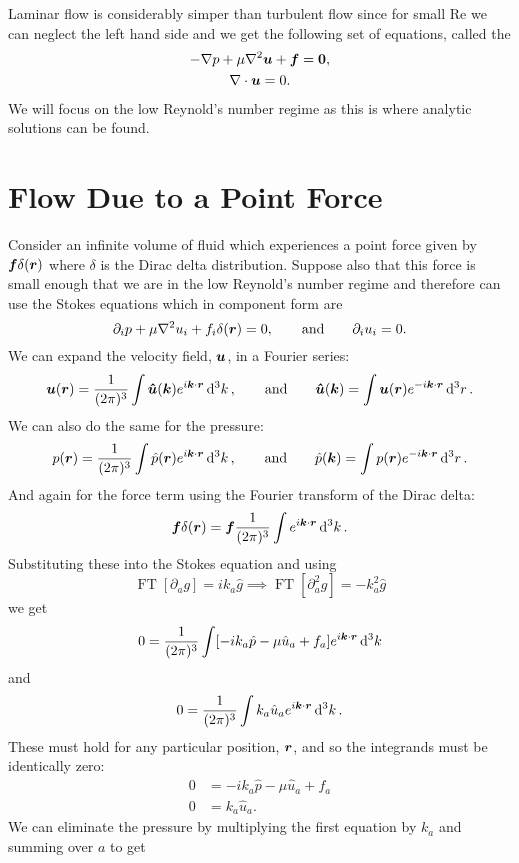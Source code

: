 \documentclass[a4paper]{article}
\DeclareMathOperator{\FT}{FT}
\newcommand{\reynoldsNumber}{\mathrm{Re}}
\begin{document}
    Laminar flow is considerably simper than turbulent flow since for small \(\reynoldsNumber\) we can neglect the left hand side and we get the following set of equations, called the 
    \begin{gather*}
        -\nabla p + \mu\nabla^2\bm{u} + \bm{f} = \bm{0},\\
        \nabla\cdot \bm{u} = 0.
    \end{gather*}
    We will focus on the low Reynold's number regime as this is where analytic solutions can be found.
    
    \section{Flow Due to a Point Force}
    Consider an infinite volume of fluid which experiences a point force given by \(\bm{f}\delta(\bm{r})\) where \(\delta\) is the Dirac delta distribution.
    Suppose also that this force is small enough that we are in the low Reynold's number regime and therefore can use the Stokes equations which in component form are
    \[\partial_i p + \mu\nabla^2 u_i + f_i\delta(\bm{r}) = 0, \qquad\text{and}\qquad \partial_iu_i = 0.\]
    We can expand the velocity field, \(\bm{u}\), in a Fourier series:
    \[\bm{u}(\bm{r}) = \frac{1}{(2\pi)^3} \int \bm{\hat{u}}(\bm{k}) e^{i\bm{k}\cdot\bm{r}}\dd[3]{k}, \qquad\text{and}\qquad \bm{\hat{u}}(\bm{k}) = \int \bm{u}(\bm{r})e^{-i\bm{k}\cdot\bm{r}} \dd[3]{r}.\]
    We can also do the same for the pressure:
    \[p(\bm{r}) = \frac{1}{(2\pi)^3} \int \hat{p}(\bm{r}) e^{i\bm{k}\cdot\bm{r}}\dd[3]{k}, \qquad\text{and}\qquad \hat{p}(\bm{k}) = \int p(\bm{r}) e^{-i\bm{k}\cdot\bm{r}} \dd[3]{r}.\]
    And again for the force term using the Fourier transform of the Dirac delta:
    \[\bm{f}\delta(\bm{r}) = \bm{f}\frac{1}{(2\pi)^3} \int e^{i\bm{k}\cdot\bm{r}} \dd[3]{k}.\]
    Substituting these into the Stokes equation and using
    \[\FT[\partial_a g] = ik_a\hat{g} \implies \FT[\partial_a^2g] = -k_a^2\hat{g}\]
    we get
    \[0 = \frac{1}{(2\pi)^3} \int [-ik_a\hat{p} - \mu\hat{u}_a + f_a]e^{i\bm{k}\cdot\bm{r}}\dd[3]{k}\]
    and
    \[0 = \frac{1}{(2\pi)^3} \int k_a\hat{u}_a e^{i\bm{k}\cdot\bm{r}}\dd[3]{k}.\]
    These must hold for any particular position, \(\bm{r}\), and so the integrands must be identically zero:
    \begin{align*}
        0 &= -ik_a\hat{p} - \mu\hat{u}_a + f_a\\
        0 &= k_a\hat{u}_a.
    \end{align*}
    We can eliminate the pressure by multiplying the first equation by \(k_a\) and summing over \(a\) to get
\end{document}
